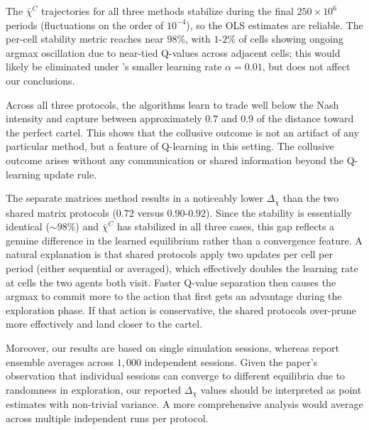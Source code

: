 \documentclass[11pt]{article}
\begin{document}
The $\bar{\chi}^C$ trajectories for all three methods stabilize during the
final $250 \times 10^6$ periods (fluctuations on the order of $10^{-4}$), so the OLS
estimates are reliable. The per-cell stability metric reaches near $98\%$,
with $1$-$2\%$ of cells showing ongoing argmax oscillation due to
near-tied Q-values across adjacent cells; this would
likely be eliminated under \citet{Dou2025}'s smaller learning rate
$\alpha = 0.01$, but does not affect our conclusions.

Across all three protocols, the algorithms learn to trade well
below the Nash intensity and capture between approximately $0.7$ and $0.9$ of
the distance toward the perfect cartel. This shows that the
collusive outcome is not an artifact of any particular method, but a feature of Q-learning in this setting. The
collusive outcome arises without any communication or shared information beyond the Q-learning update rule.

The separate matrices method results in a noticeably lower $\Delta_\chi$
than the two shared matrix protocols ($0.72$ versus $0.90$-$0.92$). Since the stability is essentially identical ($\sim 98\%$) and
$\bar{\chi}^C$ has stabilized in all three cases, this gap reflects a
genuine difference in the learned equilibrium rather than a convergence
feature. A natural explanation is that shared protocols apply two
updates per cell per period (either sequential or
averaged), which effectively doubles the learning rate at cells the two
agents both visit. Faster Q-value separation then causes the argmax to
commit more to the action that first gets an advantage during
the exploration phase. If that action is conservative,
the shared protocols over-prune more effectively and land closer to
the cartel.

Moreover, our results are based on single simulation sessions, whereas \citet{Dou2025}
report ensemble averages across $1{,}000$ independent sessions. Given the
paper's observation that individual sessions can converge to different
equilibria due to randomness in exploration, our reported $\Delta_\chi$
values should be interpreted as point estimates with non-trivial variance. A more comprehensive analysis would
average across multiple independent runs per protocol. \\
\end{document}

